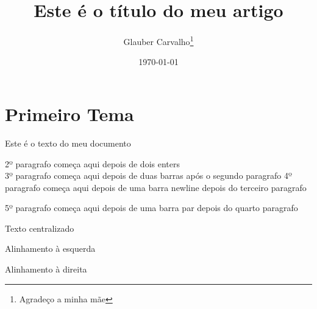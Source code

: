 \documentclass[12pt, a4paper, twocolumn]{article}	%
\title{Este é o título do meu artigo}	%
\author{Glauber Carvalho\thanks{Agradeço a minha mãe}}	%
\date{\today}	%
\begin{document}
	\begin{titlepage}
		\maketitle
	\end{titlepage}
	
	\begin{abstract}
		\lipsum[1]
	\end{abstract}

	\section{Primeiro Tema}
	
	
		Este é o texto do meu documento 	
		
		2º paragrafo começa aqui depois de dois enters\\ 	
		3º paragrafo começa aqui depois de duas barras após o segundo paragrafo\newline
		4º paragrafo começa aqui depois de uma barra newline depois do terceiro paragrafo\par
		5º paragrafo começa aqui depois de uma barra par depois do quarto paragrafo
		
		\begin{center}
			Texto centralizado
		\end{center}
	
		\begin{flushleft}
			Alinhamento à esquerda
		\end{flushleft}
		
		\begin{flushright}
			Alinhamento à direita
		\end{flushright}
		
\end{document}
